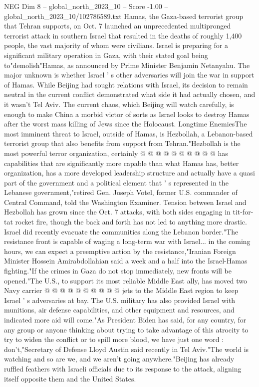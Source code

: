 \begin{textsample}{NEG Dim 8 – global\_north\_2023\_10 – Score -1.00 – global\_north\_2023\_10/102786589.txt}  \label{ex:f8_neg_215}
Hamas, the Gaza-based terrorist group that Tehran supports, on Oct. 7 launched an unprecedented multipronged terrorist attack in southern Israel that resulted in the deaths of roughly 1,400 people, the vast majority of whom were civilians.
Israel is preparing for a significant military operation in Gaza, with their stated goal being to"demolish"Hamas, as announced by Prime Minister Benjamin Netanyahu.
The major unknown is whether Israel ' s other adversaries will join the war in support of Hamas.
While Beijing had sought relations with Israel, its decision to remain neutral in the current conflict demonstrated what side it had actually chosen, and it wasn't Tel Aviv.
The current chaos, which Beijing will watch carefully, is enough to make China a morbid victor of sorts as Israel looks to destroy Hamas after the worst mass killing of Jews since the Holocaust.
Longtime EnemiesThe most imminent threat to Israel, outside of Hamas, is Hezbollah, a Lebanon-based terrorist group that also benefits from support from Tehran."Hezbollah is the most powerful terror organization, certainly @ @ @ @ @ @ @ @ @ @ has capabilities that are significantly more capable than what Hamas has, better organization, has a more developed leadership structure and actually have a quasi part of the government and a political element that ' s represented in the Lebanese government,"retired Gen.
Joseph Votel, former U.S. commander of Central Command, told the Washington Examiner.
Tension between Israel and Hezbollah has grown since the Oct. 7 attacks, with both sides engaging in tit-for-tat rocket fire, though the back and forth has not led to anything more drastic.
Israel did recently evacuate the communities along the Lebanon border."The resistance front is capable of waging a long-term war with Israel... in the coming hours, we can expect a preemptive action by the resistance,"Iranian Foreign Minister Hossein Amirabdollahian said a week and a half into the Israel-Hamas fighting."If the crimes in Gaza do not stop immediately, new fronts will be opened."The U.S., to support its most reliable Middle East ally, has moved two Navy carrier @ @ @ @ @ @ @ @ @ @ jets to the Middle East region to keep Israel ' s adversaries at bay.
The U.S. military has also provided Israel with munitions, air defense capabilities, and other equipment and resources, and indicated more aid will come."As President Biden has said, for any country, for any group or anyone thinking about trying to take advantage of this atrocity to try to widen the conflict or to spill more blood, we have just one word : don't,"Secretary of Defense Lloyd Austin said recently in Tel Aviv."The world is watching and so are we, and we aren't going anywhere."Beijing has already ruffled feathers with Israeli officials due to its response to the attack, aligning itself opposite them and the United States.

\end{textsample}
